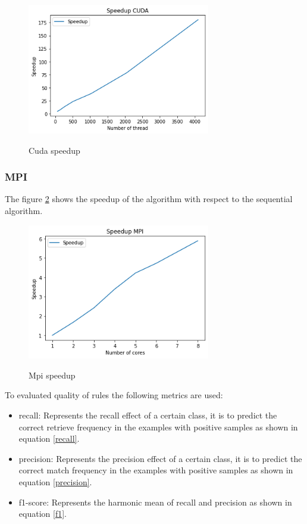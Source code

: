 \documentclass{IEEEtran}
\begin{document}
\begin{figure}[ht]
  \caption{Cuda speedup}
  \centering
  \includegraphics[width=8cm]{img/speep_cuda.png}
  \label{fig:cuda speed}
\end{figure}

\subsubsection{MPI}

The figure \ref{fig:mpi speed} shows the speedup of the algorithm with respect to the sequential algorithm.

\begin{figure}[ht]
  \caption{Mpi speedup}
  \centering
  \includegraphics[width=8cm]{img/speep_mpi.png}
  \label{fig:mpi speed}
\end{figure}



To evaluated quality of rules the following metrics are used:
\begin{itemize}
  \item recall: Represents the recall effect of a certain class, it is to predict the correct retrieve frequency in the examples with positive samples as shown in equation \ref{recall}.
  \item precision: Represents the precision effect of a certain class, it is to predict the correct match frequency in the examples with positive samples as shown in equation \ref{precision}.
  \item f1-score: Represents the harmonic mean of recall and precision as shown in equation \ref{f1}.
\end{itemize}
\end{document}

